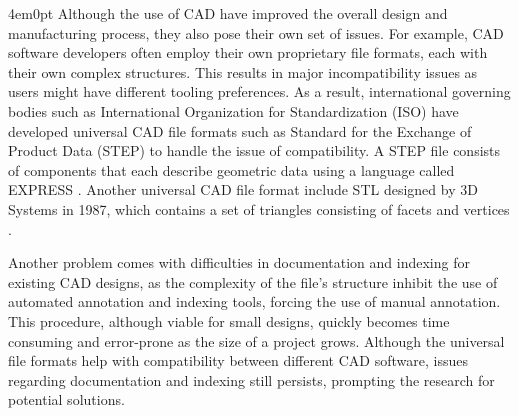 \begin{indentedblock}{4em}{0pt}
			Although the use of CAD have improved the overall design and manufacturing process, they also pose their own set of issues. For example, CAD software developers often employ their own proprietary file formats, each with their own complex structures. This results in major incompatibility issues as users might have different tooling preferences. As a result, international governing bodies such as International Organization for Standardization (ISO) have developed universal CAD file formats such as Standard for the Exchange of Product Data (STEP) to handle the issue of compatibility. A STEP file consists of components that each describe geometric data using a language called EXPRESS \parencite{step_iso_pratt}. Another universal CAD file format include STL designed by 3D Systems in 1987, which contains a set of triangles consisting of facets and vertices \parencite{stl_nagy}.
			
			
			 Another problem comes with difficulties in documentation and indexing for existing CAD designs, as the complexity of the file's structure inhibit the use of automated annotation and indexing tools, forcing the use of manual annotation. This procedure, although viable for small designs, quickly becomes time consuming and error-prone as the size of a project grows. Although the universal file formats help with compatibility between different CAD software, issues regarding documentation and indexing still persists, prompting the research for potential solutions.
		\end{indentedblock}

